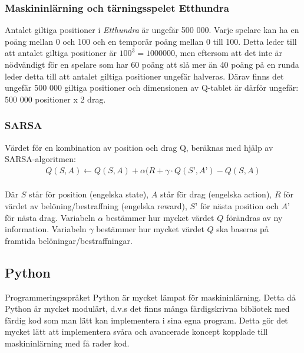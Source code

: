 \documentclass[12pt,a4paper]{article}
\begin{document}
      \subsubsection{Maskininlärning och tärningsspelet Etthundra}
      \label{subsubsec:maskininlarningochtarningsspeletetthundra}
        Antalet giltiga positioner i \emph{Etthundra} är ungefär 500 000. Varje spelare kan ha en poäng mellan 0 och 100 och en temporär poäng mellan 0 till 100. Detta leder till att antalet giltiga positioner är $100^3 = 1 000 000$, men eftersom att det inte är nödvändigt för en spelare som har $60$ poäng att slå mer än 40 poäng på en runda leder detta till att antalet giltiga positioner ungefär halveras. Därav finns det ungefär 500 000 giltiga positioner och dimensionen av Q-tablet är därför ungefär: 500 000 positioner x 2 drag.


      \cleardoublepage


      \subsubsection{SARSA}\label{subsubsec:sarsa}
        Värdet för en kombination av position och drag Q, beräknas med hjälp av SARSA-algoritmen:
        \begin{eqnarray}\label{eqn:sarsa}
          Q(S, A) \leftarrow Q(S, A) + \alpha(R + \gamma \cdot Q(S’, A’) - Q(S, A)
        \end{eqnarray} \\
        Där $S$ står för position (engelska state), $A$ står för drag (engelska action), $R$ för värdet av belöning/bestraffning (engelska reward), $S’$ för nästa position och $A’$ för nästa drag. Variabeln $\alpha$ bestämmer hur mycket värdet $Q$ förändras av ny information. Variabeln $\gamma$ bestämmer hur mycket värdet $Q$ ska baseras på framtida belöningar/bestraffningar.
    

    \subsection{Python}\label{subsec:python}
      Programmeringsspråket Python är mycket lämpat för maskininlärning. Detta då Python är mycket modulärt, d.v.s det finns många färdigskrivna bibliotek med färdig kod som man lätt kan implementera i sina egna program. Detta gör det mycket lätt att implementera svåra och avancerade koncept kopplade till maskininlärning med få rader kod. 
      
\end{document}
